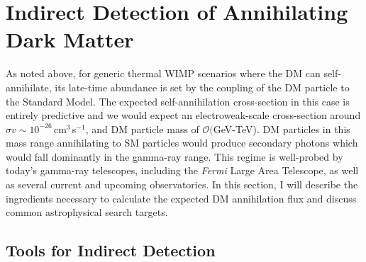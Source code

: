 \section{Indirect Detection of Annihilating Dark Matter}
\label{sec:astrodm}

As noted above, for generic thermal WIMP scenarios where the DM can self-annihilate, its late-time abundance is set by the coupling of the DM particle to the Standard Model. The expected self-annihilation cross-section in this case is entirely predictive and we would expect an electroweak-scale cross-section around $\sigma v\sim 10^{-26}$\,cm$^3$\,s$^{-1}$, and DM particle mass of $\mathcal O($GeV-TeV). DM particles in this mass range annihilating to SM particles would produce secondary photons which would fall dominantly in the gamma-ray range. This regime is well-probed by today's gamma-ray telescopes, including the \emph{Fermi} Large Area Telescope, as well as several current and upcoming observatories. In this section, I will describe the ingredients necessary to calculate the expected DM annihilation flux and discuss common astrophysical search targets. 

\subsection{Tools for Indirect Detection}

